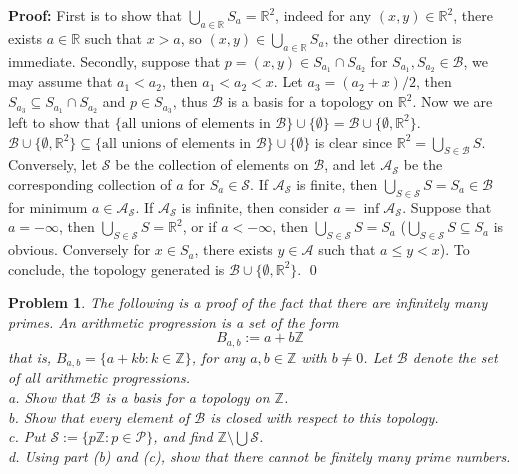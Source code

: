 \documentclass[12pt]{article}
\newtheorem{problem}{Problem}
\begin{document}
\textbf{Proof:} First is to show that $\bigcup_{a\in\mathbb{R}}S_{a}=\mathbb{R}^{2}$, indeed for any $(x, y)\in\mathbb{R}^{2}$, there exists $a\in\mathbb{R}$ such that $x>a$, so $(x,y)\in\bigcup_{a\in\mathbb{R}}S_{a}$, the other direction is immediate. Secondly, suppose that $p=(x,y)\in S_{a_{1}}\cap S_{a_{2}}$ for $S_{a_{1}}, S_{a_{2}}\in\mathcal{B}$, we may assume that $a_{1}<a_{2}$, then $a_{1}<a_{2}<x$. Let $a_{3}=(a_{2}+x)/2$, then $S_{a_{3}}\subseteq S_{a_{1}}\cap S_{a_{2}}$ and $p\in S_{a_{3}}$, thus $\mathcal{B}$ is a basis for a topology on $\mathbb{R}^{2}$. Now we are left to show that $\{\text{all unions of elements in } \mathcal{B}\}\cup \{\emptyset\}=\mathcal{B}\cup\{\emptyset, \mathbb{R}^{2}\}$. $\mathcal{B}\cup\{\emptyset, \mathbb{R}^{2}\}\subseteq\{\text{all unions of elements in } \mathcal{B}\}\cup \{\emptyset\}$ is clear since $\mathbb{R}^{2}=\bigcup_{S\in \mathcal{B}}S$. Conversely, let $\mathcal{S}$ be the collection of elements on $\mathcal{B}$, and let $\mathcal{A}_{\mathcal{S}}$ be the corresponding collection of $a$ for $S_{a}\in\mathcal{S}$. If $\mathcal{A}_{\mathcal{S}}$ is finite, then $\bigcup_{S\in\mathcal{S}}S=S_{a}\in\mathcal{B}$ for minimum $a\in\mathcal{A}_{\mathcal{S}}$. If $\mathcal{A}_{\mathcal{S}}$ is infinite, then consider $a=\inf\mathcal{A}_{\mathcal{S}}$. Suppose that $a = -\infty$, then $\bigcup_{S\in\mathcal{S}}S=\mathbb{R}^{2}$, or if $a< -\infty$, then $\bigcup_{S\in\mathcal{S}}S=S_{a}$ ($\bigcup_{S\in\mathcal{S}}S\subseteq S_{a}$ is obvious. Conversely for $x\in S_{a}$, there exists $y\in\mathcal{A}$ such that $a\leq y < x$). To conclude, the topology generated is $\mathcal{B}\cup\{\emptyset, \mathbb{R}^{2}\}$. \qed
\\
\begin{problem}
The following is a proof of the fact that there are infinitely many primes. An arithmetic progression is a set of the form 
$$
B_{a,b}:= a+b\mathbb{Z}
$$ that is, $B_{a,b}=\{a+kb: k\in\mathbb{Z}\}$, for any $a,b\in\mathbb{Z}$ with $b\neq 0$. Let $\mathcal{B}$ denote the set of all arithmetic progressions. \\
\indent a. Show that $\mathcal{B}$ is a basis for a topology on $\mathbb{Z}$. \\
\indent b. Show that every element of $\mathcal{B}$ is closed with respect to this topology. \\
\indent c. Put $\mathcal{S}:= \{p\mathbb{Z}: p\in\mathcal{P}\}$, and find $\mathbb{Z}\setminus\bigcup\mathcal{S}$. \\
\indent d. Using part (b) and (c), show that there cannot be finitely many prime numbers.
\end{problem}
\end{document}

